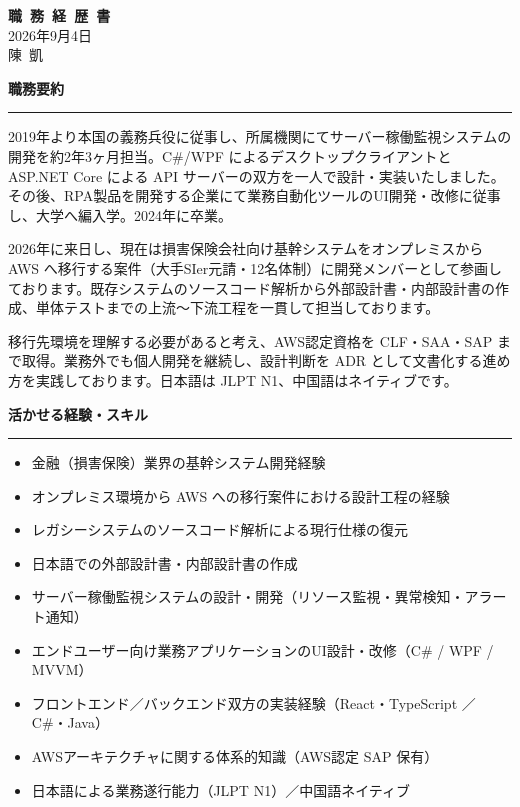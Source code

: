 \documentclass[paper=a4paper,fontsize=10pt,head_space=18mm,foot_space=15mm,gutter=15mm,fore_edge=15mm,baselineskip=16pt]{jlreq}
\newcommand{\kyariku}[1]{%
  \par\vspace{10pt}%
  {\Large\bfseries #1}\par\vspace{4pt}%
  {\color{gray}\rule{\textwidth}{0.4pt}}\par\vspace{6pt}%
}
\begin{document}
\begin{center}
  {\Huge\bfseries 職\ 務\ 経\ 歴\ 書}\\[6pt]
  2026年9月4日\\[2pt]
  陳\ 凱
\end{center}

\vspace{4pt}

\kyariku{職務要約}

2019年より本国の義務兵役に従事し、所属機関にてサーバー稼働監視システムの開発を約2年3ヶ月担当。C\#/WPF によるデスクトップクライアントと ASP.NET Core による API サーバーの双方を一人で設計・実装いたしました。その後、RPA製品を開発する企業にて業務自動化ツールのUI開発・改修に従事し、大学へ編入学。2024年に卒業。

2026年に来日し、現在は損害保険会社向け基幹システムをオンプレミスから AWS へ移行する案件（大手SIer元請・12名体制）に開発メンバーとして参画しております。既存システムのソースコード解析から外部設計書・内部設計書の作成、単体テストまでの上流〜下流工程を一貫して担当しております。

移行先環境を理解する必要があると考え、AWS認定資格を CLF・SAA・SAP まで取得。業務外でも個人開発を継続し、設計判断を ADR として文書化する進め方を実践しております。日本語は JLPT N1、中国語はネイティブです。

\kyariku{活かせる経験・スキル}

\begin{itemize}
  \item 金融（損害保険）業界の基幹システム開発経験
  \item オンプレミス環境から AWS への移行案件における設計工程の経験
  \item レガシーシステムのソースコード解析による現行仕様の復元
  \item 日本語での外部設計書・内部設計書の作成
  \item サーバー稼働監視システムの設計・開発（リソース監視・異常検知・アラート通知）
  \item エンドユーザー向け業務アプリケーションのUI設計・改修（C\# / WPF / MVVM）
  \item フロントエンド／バックエンド双方の実装経験（React・TypeScript ／ C\#・Java）
  \item AWSアーキテクチャに関する体系的知識（AWS認定 SAP 保有）
  \item 日本語による業務遂行能力（JLPT N1）／中国語ネイティブ
\end{itemize}
\end{document}
